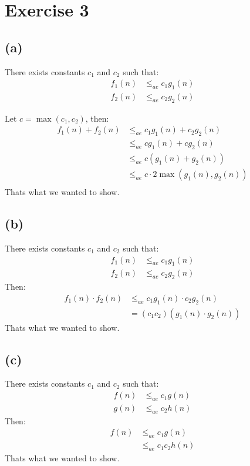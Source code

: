 \documentclass{article}
\begin{document}
\section*{Exercise 3}

\subsection*{(a)}
There exists constants \(c_1\) and \(c_2\) such that:
\begin{align*}
   f_1(n) &\leq_{ae} c_1 g_1(n) \\
   f_2(n) &\leq_{ae} c_2 g_2(n)
\end{align*}

Let \(c = \max(c_1, c_2)\), then:
\begin{align*}
   f_1(n) + f_2(n) &\leq_{ae} c_1 g_1(n) + c_2 g_2(n) \\
   &\leq_{ae} c g_1(n) + c g_2(n) \\
   &\leq_{ae} c (g_1(n) + g_2(n)) \\
   &\leq_{ae} c \cdot 2 \max(g_1(n), g_2(n)) \\
\end{align*}
Thats what we wanted to show.

\subsection*{(b)}
There exists constants \(c_1\) and \(c_2\) such that:
\begin{align*}
   f_1(n) &\leq_{ae} c_1 g_1(n) \\
   f_2(n) &\leq_{ae} c_2 g_2(n)
\end{align*}
Then:
\begin{align*}
   f_1(n) \cdot f_2(n) &\leq_{ae} c_1 g_1(n) \cdot c_2 g_2(n) \\
   &= (c_1 c_2) (g_1(n) \cdot g_2(n))
\end{align*}
Thats what we wanted to show.

\subsection*{(c)}
There exists constants \(c_1\) and \(c_2\) such that:
\begin{align*}
   f(n) &\leq_{ae} c_1 g(n) \\
   g(n) &\leq_{ae} c_2 h(n)
\end{align*}
Then:
\begin{align*}
   f(n) &\leq_{ae} c_1 g(n) \\
   &\leq_{ae} c_1 c_2 h(n)
\end{align*}
Thats what we wanted to show.
\end{document}
